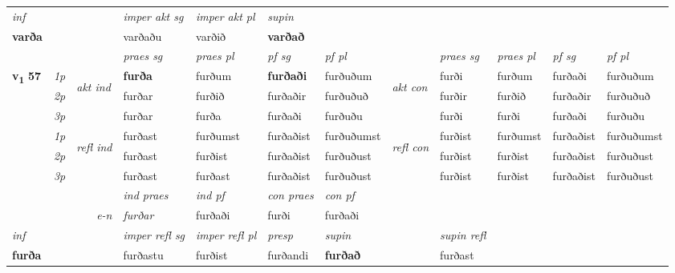 \begin{longtable}[l]{X>{\footnotesize\itshape}llXXXXlXXXX}
   {\textit{inf}} & &  & \textit{imper akt sg} & \textit{imper akt pl}    & \textit{supin}   \\*
  {\textbf{varða}} & && varðaðu  & varðið    &  \textbf{varðað}   \\*

\midrule

 & &   & \textit{praes sg}  & \textit{praes pl}    & \textit{ pf sg} & \textit{pf pl} & & \textit{praes sg}  & \textit{praes pl}    & \textit{pf sg} & \textit{pf pl }  \\ \cmidrule{4-7} \cmidrule{9-12}
 \multirow{2}{*}{{{\textbf{v{\textsubscript{1}}} \Large{\textbf{57}}}}}  & 1p & \multirow{3}{*}{\begin{turn}{90}\textit{akt ind}\end{turn}} & \textbf{furða} & furðum & \textbf{furðaði} & furðuðum & \multirow{3}{*}{\begin{turn}{90}\textit{akt con}\end{turn}} &furði & furðum & furðaði & furðuðum\\*
 & 2p &  &  furðar  & furðið & furðaðir & furðuðuð & & furðir & furðið & furðaðir & furðuðuð \\*
 & 3p &  & furðar & furða & furðaði & furðuðu & & furði & furði& furðaði & furðuðu \\*
\cmidrule{4-7} \cmidrule{9-12}
 & 1p & \multirow{3}{*}{\begin{turn}{90}\textit{refl ind}\end{turn}}  & furðast & furðumst & furðaðist & furðuðumst & \multirow{3}{*}{\begin{turn}{90}\textit{refl con}\end{turn}}  &furðist & furðumst & furðaðist & furðuðumst \\*
 & 2p &  & furðast & furðist & furðaðist & furðuðust & &furðist & furðist & furðaðist & furðuðust \\*
 & 3p  & & furðast & furðast & furðaðist & furðuðust & & furðist & furðist& furðaðist & furðuðust \\*
\cmidrule{4-7} \cmidrule{9-12}

   && &  \textit{ind praes} & \textit{ind pf} & \textit{con praes} & \textit{con pf} \\*
\multicolumn{3}{r}{\textit{e-n}} & furðar & furðaði & furði & furðaði \\*

\cmidrule{4-7}
   {\textit{inf}} & &   & \textit{imper refl sg} & \textit{imper refl pl} & \textit{presp} & \textit{supin} && \textit{supin refl}  \\*
  {\textbf{furða}} & &   & furðastu & furðist & furðandi &  \textbf{furðað} && furðast  \\*


\end{longtable}
